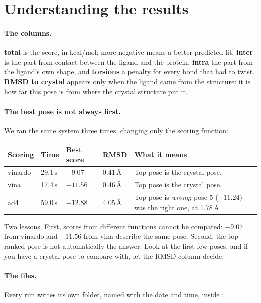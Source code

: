 \section{Understanding the results}
\label{sec:docking-results}

\paragraph{The columns.} \textbf{total} is the score, in kcal/mol; more
negative means a better predicted fit. \textbf{inter} is the part from contact
between the ligand and the protein, \textbf{intra} the part from the ligand's
own shape, and \textbf{torsions} a penalty for every bond that had to twist.
\textbf{RMSD to crystal} appears only when the ligand came from the structure:
it is how far this pose is from where the crystal structure put it.

\paragraph{The best pose is not always first.} We ran the same system three
times, changing only the scoring function:

\begin{tabularx}{\linewidth}{@{}llllL@{}}
\toprule
\textbf{Scoring} & \textbf{Time} & \textbf{Best score} & \textbf{RMSD} &
\textbf{What it means} \\
\midrule
vinardo & 29.1\,s & $-9.07$ & 0.41\,\AA{} & Top pose is the crystal pose. \\
vina & 17.4\,s & $-11.56$ & 0.46\,\AA{} & Top pose is the crystal pose. \\
ad4 & 59.0\,s & $-12.88$ & 4.05\,\AA{} & Top pose is \emph{wrong}; pose 5
  ($-11.24$) was the right one, at 1.78\,\AA. \\
\bottomrule
\end{tabularx}

\medskip
Two lessons. First, scores from different functions cannot be compared: $-9.07$
from vinardo and $-11.56$ from vina describe the same pose. Second, the
top-ranked pose is not automatically the answer. Look at the first few poses,
and if you have a crystal pose to compare with, let the RMSD column decide.

\paragraph{The files.} Every run writes its own folder, named with the date and
time, inside :

